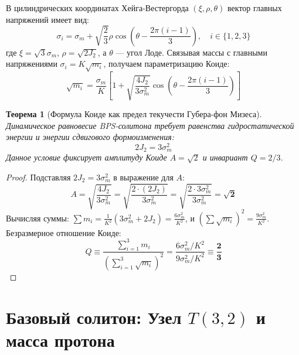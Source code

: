 \documentclass[12pt,a4paper]{article}
\newtheorem{theorem}{Теорема}
\begin{document}
	В цилиндрических координатах Хейга-Вестергорда $(\xi, \rho, \theta)$ вектор главных напряжений имеет вид:
	\begin{equation}
		\sigma_i = \sigma_m + \sqrt{\frac{2}{3}} \rho \cos\left( \theta - \frac{2\pi(i-1)}{3} \right), \quad i \in \{1,2,3\}
	\end{equation}
	где $\xi = \sqrt{3}\sigma_m$, $\rho = \sqrt{2J_2}$, а $\theta$ — угол Лоде. Связывая массы с главными напряжениями $\sigma_i = K\sqrt{m_i}$, получаем параметризацию Коиде:
	\begin{equation}
		\sqrt{m_i} = \frac{\sigma_m}{K} \left[ 1 + \sqrt{\frac{4J_2}{3\sigma_m^2}} \cos\left( \theta - \frac{2\pi(i-1)}{3} \right) \right]
	\end{equation}
	
	\begin{theorem}[Формула Коиде как предел текучести Губера-фон Мизеса]
		Динамическое равновесие BPS-солитона требует равенства гидростатической энергии и энергии сдвигового формоизменения:
		\begin{equation}
			2 J_2 = 3 \sigma_m^2
		\end{equation}
		Данное условие фиксирует амплитуду Коиде $A = \sqrt{2}$ и инвариант $Q = 2/3$.
	\end{theorem}
	
	\begin{proof}
		Подставляя $2J_2 = 3\sigma_m^2$ в выражение для $A$:
		\begin{equation}
			A = \sqrt{\frac{4 J_2}{3 \sigma_m^2}} = \sqrt{\frac{2 \cdot (2 J_2)}{3 \sigma_m^2}} = \sqrt{\frac{2 \cdot 3 \sigma_m^2}{3 \sigma_m^2}} = \mathbf{\sqrt{2}}
		\end{equation}
		Вычисляя суммы: $\sum m_i = \frac{1}{K^2}(3\sigma_m^2 + 2J_2) = \frac{6\sigma_m^2}{K^2}$, и $\left(\sum \sqrt{m_i}\right)^2 = \frac{9\sigma_m^2}{K^2}$. Безразмерное отношение Коиде:
		\begin{equation}
			Q \equiv \frac{\sum_{i=1}^3 m_i}{\left( \sum_{i=1}^3 \sqrt{m_i} \right)^2} = \frac{6 \sigma_m^2 / K^2}{9 \sigma_m^2 / K^2} \equiv \mathbf{\frac{2}{3}}
		\end{equation}
	\end{proof}
	
	\section{Базовый солитон: Узел $T(3,2)$ и масса протона}
	
\end{document}
